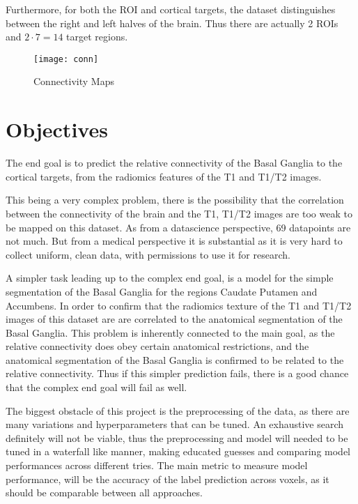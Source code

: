Furthermore, for both the \ac{ROI} and cortical targets, the dataset distinguishes between the right and left halves of the brain. Thus there are actually 2 \ac{ROI}s and $2 \cdot 7=14$ target regions.

\begin{figure}[H]
\centering
\texttt{[image: conn]}
\caption{Connectivity Maps}
\label{fig:conn}
\end{figure}

\section{Objectives}

The end goal is to predict the relative connectivity of the Basal Ganglia to the cortical targets, from the radiomics features of the T1 and T1/T2 images.\par

This being a very complex problem, there is the possibility that the correlation between the connectivity of the brain and the T1, T1/T2 images are too weak to be mapped on this dataset. As from a datascience perspective, 69 datapoints are not much. But from a medical perspective it is substantial as it is very hard to collect uniform, clean data, with permissions to use it for research.\par

A simpler task leading up to the complex end goal, is a model for the simple segmentation of the Basal Ganglia for the regions Caudate Putamen and Accumbens. In order to confirm that the radiomics texture of the T1 and T1/T2 images of this dataset are are correlated to the anatomical segmentation of the Basal Ganglia. This problem is inherently connected to the main goal, as the relative connectivity does obey certain anatomical restrictions, and the anatomical segmentation of the Basal Ganglia is confirmed to be related to the relative connectivity. Thus if this simpler prediction fails, there is a good chance that the complex end goal will fail as well.\par

The biggest obstacle of this project is the preprocessing of the data, as there are many variations and hyperparameters that can be tuned. An exhaustive search definitely will not be viable, thus the preprocessing and model will needed to be tuned in a waterfall like manner, making educated guesses and comparing model performances across different tries. The main metric to measure model performance, will be the accuracy of the label prediction across voxels, as it should be comparable between all approaches.

